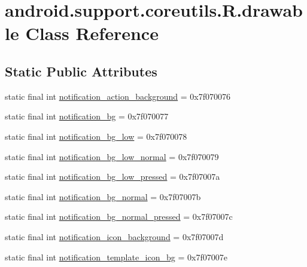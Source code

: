 \hypertarget{classandroid_1_1support_1_1coreutils_1_1_r_1_1drawable}{}\section{android.\+support.\+coreutils.\+R.\+drawable Class Reference}
\label{classandroid_1_1support_1_1coreutils_1_1_r_1_1drawable}
\subsection*{Static Public Attributes}
\begin{DoxyCompactItemize}
\item 
static final int \mbox{\hyperlink{classandroid_1_1support_1_1coreutils_1_1_r_1_1drawable_a1e0e57eea57123962ada4e4e23c7f87f}{notification\+\_\+action\+\_\+background}} = 0x7f070076
\item 
static final int \mbox{\hyperlink{classandroid_1_1support_1_1coreutils_1_1_r_1_1drawable_a86831aa5308e6938123b94a9c4d3a35b}{notification\+\_\+bg}} = 0x7f070077
\item 
static final int \mbox{\hyperlink{classandroid_1_1support_1_1coreutils_1_1_r_1_1drawable_a6b16f36ffa4bd83ee689e3071a83baef}{notification\+\_\+bg\+\_\+low}} = 0x7f070078
\item 
static final int \mbox{\hyperlink{classandroid_1_1support_1_1coreutils_1_1_r_1_1drawable_ad0a7fc5f8f7762d33444ae8bed4387a0}{notification\+\_\+bg\+\_\+low\+\_\+normal}} = 0x7f070079
\item 
static final int \mbox{\hyperlink{classandroid_1_1support_1_1coreutils_1_1_r_1_1drawable_a756152a03f6596872023681f768b6589}{notification\+\_\+bg\+\_\+low\+\_\+pressed}} = 0x7f07007a
\item 
static final int \mbox{\hyperlink{classandroid_1_1support_1_1coreutils_1_1_r_1_1drawable_a25eb67b2e64e87852fe23836ee3b6add}{notification\+\_\+bg\+\_\+normal}} = 0x7f07007b
\item 
static final int \mbox{\hyperlink{classandroid_1_1support_1_1coreutils_1_1_r_1_1drawable_ad97d2aae6d4170ca51500407c1d0cb5c}{notification\+\_\+bg\+\_\+normal\+\_\+pressed}} = 0x7f07007c
\item 
static final int \mbox{\hyperlink{classandroid_1_1support_1_1coreutils_1_1_r_1_1drawable_aac1c36b1b4016f35a539565ca5e108cd}{notification\+\_\+icon\+\_\+background}} = 0x7f07007d
\item 
static final int \mbox{\hyperlink{classandroid_1_1support_1_1coreutils_1_1_r_1_1drawable_a4522825b1e9785bad81fb01c404719ee}{notification\+\_\+template\+\_\+icon\+\_\+bg}} = 0x7f07007e

\end{DoxyCompactItemize}
